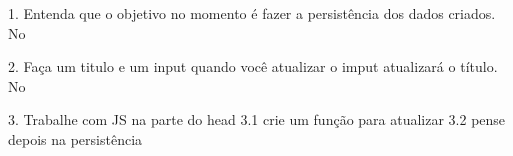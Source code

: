 1. Entenda que o objetivo no momento é fazer a persistência dos dados criados. No

2. Faça um titulo e um input quando você atualizar o imput atualizará o título. No

3. Trabalhe com JS na parte do head
  3.1 crie um função para atualizar
  3.2 pense depois na persistência

